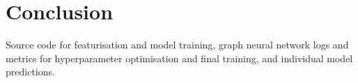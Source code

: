 \documentclass[journal=jcisd8,manuscript=article]{achemso}
\begin{document}


\section{Conclusion}





\begin{suppinfo}

    Source code for featurisation and model training, graph neural network logs
    and metrics for hyperparameter optimisation and final training, and
    individual model predictions.

\end{suppinfo}


\end{document}
